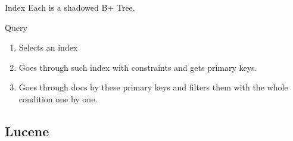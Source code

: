\documentclass[lualatex]{beamer}
\begin{document}
\begin{frame}
\begin{columns}[t]
\begin{column}{0.5\textwidth}
    \end{column}
  \end{columns}
  \begin{block}{Index}
    Each is a shadowed B+ Tree.
  \end{block}
  \begin{block}{Query}
    \begin{enumerate}
      \item Selects an index
      \item Goes through such index with constraints and gets primary keys.
      \item Goes through docs by these primary keys and filters them with the whole condition one by one.
    \end{enumerate}
  \end{block}
\end{frame}

\subsection*{Lucene}
\end{document}
